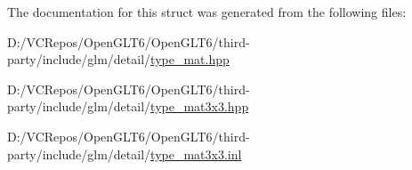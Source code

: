 The documentation for this struct was generated from the following files\+:\begin{DoxyCompactItemize}
\item 
D\+:/\+V\+C\+Repos/\+Open\+G\+L\+T6/\+Open\+G\+L\+T6/third-\/party/include/glm/detail/\mbox{\hyperlink{type__mat_8hpp}{type\+\_\+mat.\+hpp}}\item 
D\+:/\+V\+C\+Repos/\+Open\+G\+L\+T6/\+Open\+G\+L\+T6/third-\/party/include/glm/detail/\mbox{\hyperlink{type__mat3x3_8hpp}{type\+\_\+mat3x3.\+hpp}}\item 
D\+:/\+V\+C\+Repos/\+Open\+G\+L\+T6/\+Open\+G\+L\+T6/third-\/party/include/glm/detail/\mbox{\hyperlink{type__mat3x3_8inl}{type\+\_\+mat3x3.\+inl}}\end{DoxyCompactItemize}
